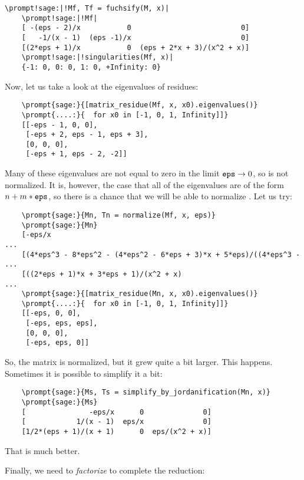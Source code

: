 \documentclass[12pt,a4paper]{article}
\begin{document}
\begin{Verbatim}[commandchars=\\!|]
    \prompt!sage:|!Mf, Tf = fuchsify(M, x)|
    \prompt!sage:|!Mf|
    [ -(eps - 2)/x           0                          0]
    [   -1/(x - 1)  (eps -1)/x                          0]
    [(2*eps + 1)/x           0  (eps + 2*x + 3)/(x^2 + x)]
    \prompt!sage:|!singularities(Mf, x)|
    {-1: 0, 0: 0, 1: 0, +Infinity: 0}
\end{Verbatim}

Now, let us take a look at the eigenvalues of  residues:

\begin{Verbatim}
    \prompt{sage:}{[matrix_residue(Mf, x, x0).eigenvalues()}
    \prompt{....:}{  for x0 in [-1, 0, 1, Infinity]]}
    [[-eps - 1, 0, 0],
     [-eps + 2, eps - 1, eps + 3],
     [0, 0, 0],
     [-eps + 1, eps - 2, -2]]
\end{Verbatim}

Many of these eigenvalues are not equal to zero in the limit $\texttt{eps}\to0$, so  is not normalized.
It is, however, the case that all of the eigenvalues are of the form $n + m*\texttt{eps}$, so there is a chance that we will be able to normalize .
Let us try:

\begin{Verbatim}
    \prompt{sage:}{Mn, Tn = normalize(Mf, x, eps)}
    \prompt{sage:}{Mn}
    [-eps/x                                                            ...
    [(4*eps^3 - 8*eps^2 - (4*eps^2 - 6*eps + 3)*x + 5*eps)/((4*eps^3 - ...
    [((2*eps + 1)*x + 3*eps + 1)/(x^2 + x)                             ...
    \prompt{sage:}{[matrix_residue(Mn, x, x0).eigenvalues()}
    \prompt{....:}{  for x0 in [-1, 0, 1, Infinity]]}
    [[-eps, 0, 0],
     [-eps, eps, eps],
     [0, 0, 0],
     [-eps, eps, 0]]
\end{Verbatim}

So, the matrix is normalized, but it grew quite a bit larger.
This happens.
Sometimes it is possible to simplify it a bit:

\begin{Verbatim}
    \prompt{sage:}{Ms, Ts = simplify_by_jordanification(Mn, x)}
    \prompt{sage:}{Ms}
    [               -eps/x      0              0]
    [            1/(x - 1)  eps/x              0]
    [1/2*(eps + 1)/(x + 1)      0  eps/(x^2 + x)]
\end{Verbatim}

That is much better.

Finally, we need to \textit{factorize}  to complete the reduction:
\end{document}
